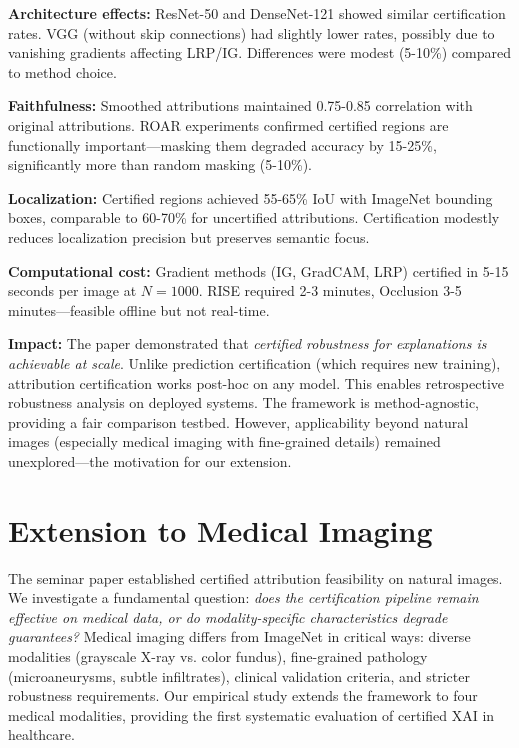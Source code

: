 \documentclass[11pt]{article}
\begin{document}
\textbf{Architecture effects:} ResNet-50 and DenseNet-121 showed similar certification rates. VGG (without skip connections) had slightly lower rates, possibly due to vanishing gradients affecting LRP/IG. Differences were modest (5-10\%) compared to method choice.

\textbf{Faithfulness:} Smoothed attributions maintained 0.75-0.85 correlation with original attributions. ROAR experiments confirmed certified regions are functionally important—masking them degraded accuracy by 15-25\%, significantly more than random masking (5-10\%).

\textbf{Localization:} Certified regions achieved 55-65\% IoU with ImageNet bounding boxes, comparable to 60-70\% for uncertified attributions. Certification modestly reduces localization precision but preserves semantic focus.

\textbf{Computational cost:} Gradient methods (IG, GradCAM, LRP) certified in 5-15 seconds per image at $N=1000$. RISE required 2-3 minutes, Occlusion 3-5 minutes—feasible offline but not real-time.

\textbf{Impact:} The paper demonstrated that \textit{certified robustness for explanations is achievable at scale}. Unlike prediction certification (which requires new training), attribution certification works post-hoc on any model. This enables retrospective robustness analysis on deployed systems. The framework is method-agnostic, providing a fair comparison testbed. However, applicability beyond natural images (especially medical imaging with fine-grained details) remained unexplored—the motivation for our extension.


\section{Extension to Medical Imaging}

The seminar paper established certified attribution feasibility on natural images. We investigate a fundamental question: \textit{does the certification pipeline remain effective on medical data, or do modality-specific characteristics degrade guarantees?} Medical imaging differs from ImageNet in critical ways: diverse modalities (grayscale X-ray vs. color fundus), fine-grained pathology (microaneurysms, subtle infiltrates), clinical validation criteria, and stricter robustness requirements. Our empirical study extends the framework to four medical modalities, providing the first systematic evaluation of certified XAI in healthcare.
\end{document}
